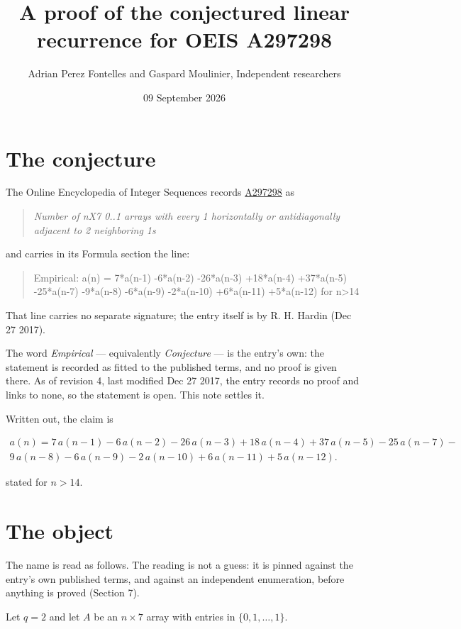 \documentclass[11pt]{article}
\title{A proof of the conjectured linear recurrence for OEIS A297298}
\author{Adrian Perez Fontelles and Gaspard Moulinier, Independent researchers}
\date{09 September 2026}
\theoremstyle{definition}
\begin{document}
\maketitle
\section{The conjecture}

The Online Encyclopedia of Integer Sequences records \href{https://oeis.org/A297298}{A297298} as

\begin{quote}\itshape Number of nX7 0..1 arrays with every 1 horizontally or antidiagonally adjacent to 2 neighboring 1s\end{quote}

and carries in its Formula section the line:

\begin{quote}\ttfamily Empirical: a(n) = 7*a(n-1) -6*a(n-2) -26*a(n-3) +18*a(n-4) +37*a(n-5) -25*a(n-7) -9*a(n-8) -6*a(n-9) -2*a(n-10) +6*a(n-11) +5*a(n-12) for n>14\end{quote}

That line carries no separate signature; the entry itself is by R. H. Hardin (Dec 27 2017).

The word {\itshape Empirical} --- equivalently {\itshape Conjecture} --- is the entry's own: the statement is recorded as fitted to the published terms, and no proof is given there. As of revision 4, last modified Dec 27 2017, the entry records no proof and links to none, so the statement is open. This note settles it.

Written out, the claim is

\begin{multline*} a(n) = 7\,a(n-1) - 6\,a(n-2) - 26\,a(n-3) + 18\,a(n-4) + 37\,a(n-5) - 25\,a(n-7) - \\ 9\,a(n-8) - 6\,a(n-9) - 2\,a(n-10) + 6\,a(n-11) + 5\,a(n-12). \end{multline*}

stated for $n > 14$.

\section{The object}

The name is read as follows. The reading is not a guess: it is pinned against the entry's own published terms, and against an independent enumeration, before anything is proved (Section 7).

Let $q = 2$ and let $A$ be an $n \times 7$ array with entries in $\{0,1,\dots,1\}$.
\end{document}
